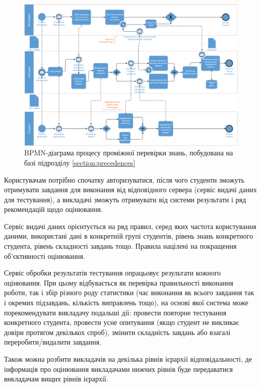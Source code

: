 \begin{figure}[h!]
    \center\includegraphics[width=\textwidth]{images/bpmn_tests.png}
    \caption{BPMN-діаграма процесу проміжної перевірки знань,
    побудована на базі підрозділу \ref{section:precedences}}
    \label{fig:bpmn_tests}
\end{figure}

Користувачам потрібно спочатку авторизуватися, після чого студенти зможуть
отримувати завдання для виконання від відповідного сервера (сервіс видачі даних
для тестування), а викладачі зможуть отримувати від системи результати і ряд
рекомендацій щодо оцінювання.

Сервіс видачі даних орієнтується на ряд правил, серед яких частота користування
даними, використані дані в конкретній групі студентів, рівень знань конкретного
студента, рівень складності завдань тощо.
Правила націлені на покращення об’єктивності оцінювання.

Сервіс обробки результатів тестування опрацьовує результати кожного оцінювання.
При цьому відбувається як перевірка правильності виконання роботи, так і збір
різного роду статистики (час виконання як всього завдання так і окремих
підзавдань, кількість виправлень тощо), на основі якої система може
порекомендувати викладачу подальші дії: провести повторне тестування
конкретного студента, провести усне опитування (якщо студент не викликає довіри
протягом декількох спроб), змінити складність завдань або взагалі
переробити/видалити завдання.

Також можна розбити викладачів на декілька рівнів ієрархії відповідальності, де
інформація про оцінювання викладачами нижчих рівнів буде передаватися викладачам
вищих рівнів ієрархії.

